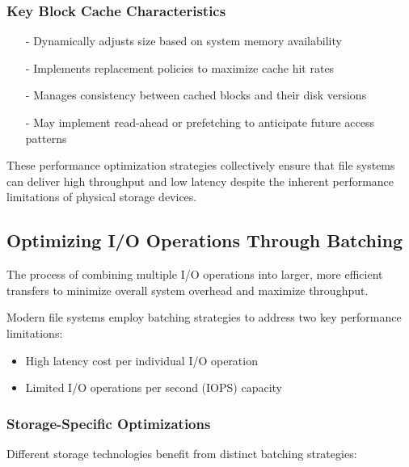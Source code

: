 \documentclass[../../compsys.tex]{subfiles}
\begin{document}
\subsubsection{Key Block Cache Characteristics}
\begin{itemize}
  \item[-] Dynamically adjusts size based on system memory availability
  \item[-] Implements replacement policies to maximize cache hit rates
  \item[-] Manages consistency between cached blocks and their disk versions
  \item[-] May implement read-ahead or prefetching to anticipate future access patterns
\end{itemize}

These performance optimization strategies collectively ensure that file systems can deliver high throughput and low latency despite the inherent performance limitations of physical storage devices.
\newpage
\subsection{Optimizing I/O Operations Through Batching}

\begin{definition}[I/O Batching]
The process of combining multiple I/O operations into larger, more efficient transfers to minimize overall system overhead and maximize throughput.
\end{definition}

Modern file systems employ batching strategies to address two key performance limitations:
\begin{itemize}
    \item High latency cost per individual I/O operation
    \item Limited I/O operations per second (IOPS) capacity
\end{itemize}

\subsubsection{Storage-Specific Optimizations}

Different storage technologies benefit from distinct batching strategies:
\end{document}
